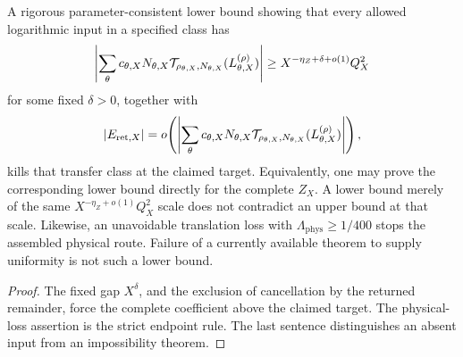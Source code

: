 \begin{proposition}
\label{prop:stop-test}
A rigorous parameter-consistent lower bound showing that every
allowed logarithmic input in a specified class has
\[
 \left|
 \sum_{\theta}
 c_{\theta,X}N_{\theta,X}
 \mathcal T_{\rho_{\theta,X},N_{\theta,X}}(L_{\theta,X}^{(\rho)})
 \right|
 \ge X^{-\eta_Z+\delta+o(1)}Q_X^2
\]
for some fixed \(\delta>0\), together with
\[
 |E_{\mathrm{ret},X}|
 =
 o\!\left(
 \left|
 \sum_{\theta}
 c_{\theta,X}N_{\theta,X}
 \mathcal T_{\rho_{\theta,X},N_{\theta,X}}
 (L_{\theta,X}^{(\rho)})
 \right|\right),
\]
kills that transfer class at the claimed target.  Equivalently, one
may prove the corresponding lower bound directly for the complete
\(Z_X\).  A lower bound merely of the same
\(X^{-\eta_Z+o(1)}Q_X^2\) scale does not contradict an upper bound at
that scale.  Likewise, an
unavoidable translation loss with
\(\Lambda_{\mathrm{phys}}\ge1/400\) stops the assembled physical
route.  Failure of a currently available theorem to supply uniformity
is not such a lower bound.
\end{proposition}

\begin{proof}
The fixed gap \(X^\delta\), and the exclusion of cancellation by the
returned remainder, force the complete coefficient above the claimed
target.  The physical-loss assertion is the strict endpoint rule.
The last sentence distinguishes an absent input from an impossibility
theorem.
\end{proof}
